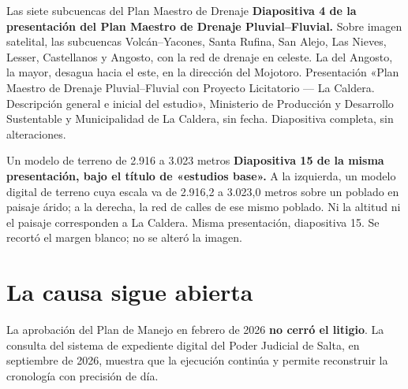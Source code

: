 %
{Las siete subcuencas del Plan Maestro de Drenaje}%
{\textbf{Diapositiva 4 de la presentación del Plan Maestro de Drenaje Pluvial--Fluvial.} Sobre imagen satelital, las subcuencas Volcán--Yacones, Santa Rufina, San Alejo, Las Nieves, Lesser, Castellanos y Angosto, con la red de drenaje en celeste. La del Angosto, la mayor, desagua hacia el este, en la dirección del Mojotoro.}%
{Presentación «Plan Maestro de Drenaje Pluvial--Fluvial con Proyecto Licitatorio --- La Caldera. Descripción general e inicial del estudio», Ministerio de Producción y Desarrollo Sustentable y Municipalidad de La Caldera, sin fecha. Diapositiva completa, sin alteraciones.}

%
{Un modelo de terreno de 2.916 a 3.023 metros}%
{\textbf{Diapositiva 15 de la misma presentación, bajo el título de «estudios base».} A la izquierda, un modelo digital de terreno cuya escala va de 2.916,2 a 3.023,0 metros sobre un poblado en paisaje árido; a la derecha, la red de calles de ese mismo poblado. Ni la altitud ni el paisaje corresponden a La Caldera.}%
{Misma presentación, diapositiva 15. Se recortó el margen blanco; no se alteró la imagen.}

\section{La causa sigue abierta}

La aprobación del Plan de Manejo en febrero de
2026 \textbf{no cerró el litigio}. La consulta del sistema de expediente digital del Poder
Judicial de Salta, en septiembre de 2026, muestra que la ejecución continúa y permite
reconstruir la cronología con precisión de día.

